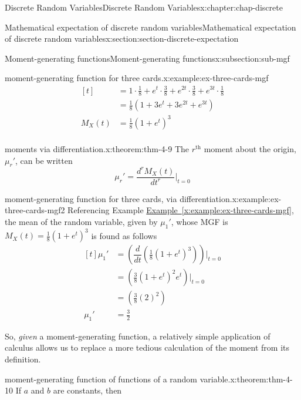 \documentclass[oneside,10pt,]{book}
\newcommand{\xreffont}{\relax}
\newcommand{\amp}{&}
\begin{document}
\begin{chapterptx}{Discrete Random Variables}{}{Discrete Random Variables}{}{}{x:chapter:chap-discrete}
\begin{sectionptx}{Mathematical expectation of discrete random variables}{}{Mathematical expectation of discrete random variables}{}{}{x:section:section-discrete-expectation}
\begin{subsectionptx}{Moment-generating functions}{}{Moment-generating functions}{}{}{x:subsection:sub-mgf}
\begin{example}{moment-generating function for three cards.}{x:example:ex-three-cards-mgf}
\begin{equation*}
\begin{aligned}[t]
\amp = 1 \cdot \frac{1}{8} + e^{t} \cdot \frac{3}{8}+ e^{2t} \cdot
\frac{3}{8} + e^{3t} \cdot \frac{1}{8}\\
\amp = \frac{1}{8} \left(1 + 3e^{t} + 3e^{2t} + e^{3t}\right)\\
M_X(t) \amp = \frac{1}{8} (1+e^t)^3\\
\end{aligned}
\end{equation*}
%
\end{example}
\begin{theorem}{moments via differentiation.}{}{x:theorem:thm-4-9}%
The \(r^\text{th}\) moment about the origin, \(\mu_r'\), can be written%
\begin{equation*}
\displaystyle \mu_r' = \dfrac{d^rM_X(t)}{dt^r}\Big|_{t=0}
\end{equation*}
%
\end{theorem}
\begin{example}{moment-generating function for three cards, via differentiation.}{x:example:ex-three-cards-mgf2}%
Referencing Example \hyperref[x:example:ex-three-cards-mgf]{Example~{\xreffont\ref{x:example:ex-three-cards-mgf}}}, the mean of the random variable, given by \(\mu_1'\), whose MGF is \(M_X(t) =
\frac{1}{8} (1+e^t)^3\) is found as follows%
\begin{equation*}
\begin{aligned}[t]
\mu_1' \amp = \left(\dfrac{d}{dt}\left(\frac{1}{8}
(1+e^t)^3\right)\right)\Big|_{t=0}\\
\amp = \left(\frac{3}{8} (1+e^t)^2e^t\right)\Big|_{t=0}\\
\amp = \left(\frac{3}{8} (2)^2\right)\\
\mu_1' \amp = \frac{3}{2}
\end{aligned}
\end{equation*}
%
\end{example}
So, \emph{given} a moment-generating function, a relatively simple application of calculus allows us to replace a more tedious calculation of the moment from its definition.%
\begin{theorem}{moment-generating function of functions of a random variable.}{}{x:theorem:thm-4-10}%
If \(\displaystyle a\) and \(\displaystyle b\) are constants, then%
\end{theorem}
\end{subsectionptx}
\end{sectionptx}
\end{chapterptx}
\end{document}
